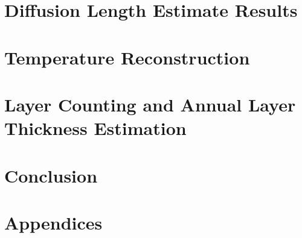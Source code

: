 \documentclass[11pt]{memoir}
\begin{document}
	
	\chapter[Results]{Diffusion Length Estimate Results}
	
	
	
	\chapter[Temperature Reconstruction]{Temperature Reconstruction}
	
	
	
	
	\chapter[Layer Counting][Layer Counting]{Layer Counting and Annual Layer Thickness Estimation}
	
	
	
	
	
	\chapter[Conclusion][Conclusion]{Conclusion}
	
	
	
	
	\backmatter
	
	 
	
	
	
	\appendix 
	
	\chapter[Appendices][Appendices]{Appendices}
	
	
\end{document}

